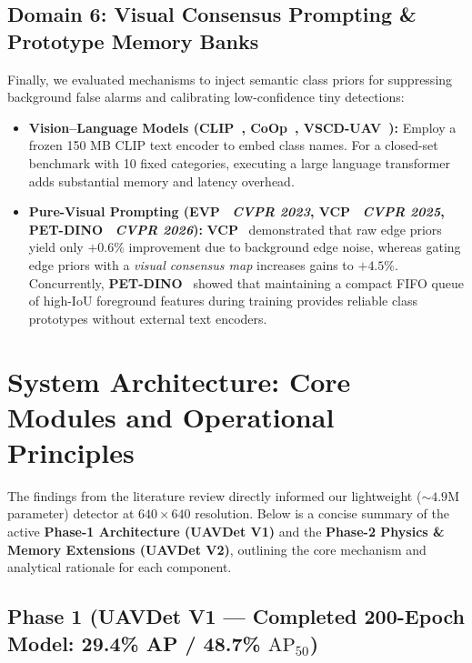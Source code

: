 \documentclass[11pt,a4paper]{article}
\begin{document}
\subsection{Domain 6: Visual Consensus Prompting \& Prototype Memory Banks}

Finally, we evaluated mechanisms to inject semantic class priors for suppressing background false alarms and calibrating low-confidence tiny detections:
\begin{itemize}[leftmargin=1.5em]
    \item \textbf{Vision--Language Models (CLIP~\cite{radford2021clip}, CoOp~\cite{zhou2022coop}, VSCD-UAV~\cite{yang2026vscduav}):} Employ a frozen 150 MB CLIP text encoder to embed class names. For a closed-set benchmark with 10 fixed categories, executing a large language transformer adds substantial memory and latency overhead.
    \item \textbf{Pure-Visual Prompting (EVP~\cite{liu2023evp} \emph{CVPR 2023}, VCP~\cite{wang2025vcp} \emph{CVPR 2025}, PET-DINO~\cite{fu2026petdino} \emph{CVPR 2026}):} \textbf{VCP}~\cite{wang2025vcp} demonstrated that raw edge priors yield only $+0.6\%$ improvement due to background edge noise, whereas gating edge priors with a \emph{visual consensus map} increases gains to $+4.5\%$. Concurrently, \textbf{PET-DINO}~\cite{fu2026petdino} showed that maintaining a compact FIFO queue of high-IoU foreground features during training provides reliable class prototypes without external text encoders.
\end{itemize}

\section{System Architecture: Core Modules and Operational Principles}

The findings from the literature review directly informed our lightweight ($\sim 4.9\text{M}$ parameter) detector at $640\times 640$ resolution. Below is a concise summary of the active \textbf{Phase-1 Architecture (UAVDet V1)} and the \textbf{Phase-2 Physics \& Memory Extensions (UAVDet V2)}, outlining the core mechanism and analytical rationale for each component.

\subsection{Phase 1 (UAVDet V1 --- Completed 200-Epoch Model: 29.4\% AP / 48.7\% $\text{AP}_{50}$)}
\end{document}
